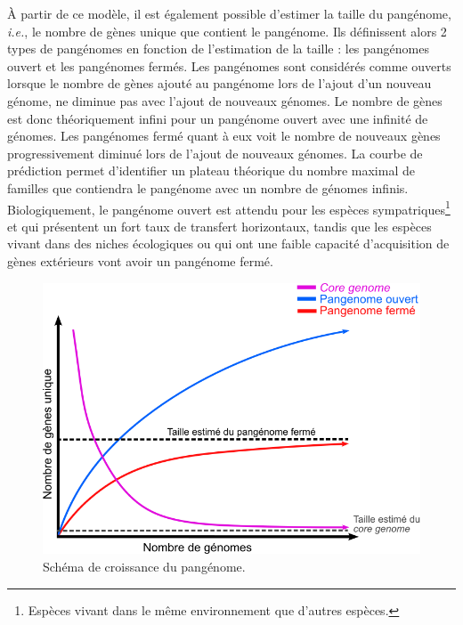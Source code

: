 À partir de ce modèle, il est également possible d'estimer la taille du pangénome, \textit{i.e.}, le nombre de gènes unique que contient le pangénome. Ils définissent alors 2 types de pangénomes en fonction de l'estimation de la taille : les pangénomes ouvert et les pangénomes fermés. Les pangénomes sont considérés comme ouverts lorsque le nombre de gènes ajouté au pangénome lors de l'ajout d'un nouveau génome, ne diminue pas avec l'ajout de nouveaux génomes. Le nombre de gènes est donc théoriquement infini pour un pangénome ouvert avec une infinité de génomes. Les pangénomes fermé quant à eux voit le nombre de nouveaux gènes progressivement diminué lors de l'ajout de nouveaux génomes. La courbe de prédiction permet d'identifier un plateau théorique du nombre maximal de familles que contiendra le pangénome avec un nombre de génomes infinis. Biologiquement, le pangénome ouvert est attendu pour les espèces sympatriques\footnote{Espèces vivant dans le même environnement que d'autres espèces.} et qui présentent un fort taux de transfert horizontaux, tandis que les espèces vivant dans des niches écologiques ou qui ont une faible capacité d'acquisition de gènes extérieurs vont avoir un pangénome fermé.

\begin{figure}[htbp]
    \centering
    \includegraphics[width=0.7\linewidth]{images/panOpenClose.png}
    \caption[Schéma de croissance du pangénome]{Schéma de croissance du pangénome.}
    \label{fig:panOpenClose}
\end{figure}

